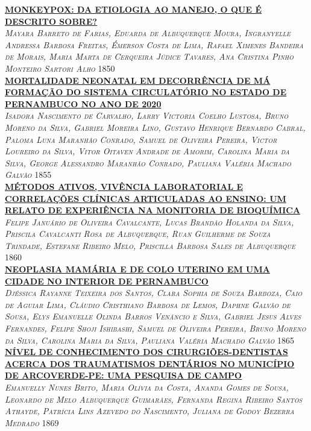 \noindent \textsc{\hyperlink{trabalhos/250264.pdf.1}{\textbf{MONKEYPOX: DA ETIOLOGIA AO MANEJO, O QUE É DESCRITO SOBRE?}}}\\ 
\noindent \textsc{\textit{Mayara Barreto de Farias, Eduarda de Albuquerque Moura, Ingranyelle Andressa Barbosa Freitas, Émerson Costa de Lima, Rafael Ximenes Bandeira de Morais, Maria Marta de Cerqueira Júdice Tavares, Ana Cristina Pinho Monteiro Sartori Alho}} \hfill 1850\\ 

\noindent \textsc{\hyperlink{trabalhos/251072.pdf.1}{\textbf{MORTALIDADE NEONATAL EM DECORRÊNCIA DE MÁ FORMAÇÃO DO SISTEMA CIRCULATÓRIO NO ESTADO DE  PERNAMBUCO NO ANO DE 2020}}}\\ 
\noindent \textsc{\textit{Isadora Nascimento de Carvalho, Larry Victoria Coelho Lustosa, Bruno Moreno da Silva, Gabriel Moreira Lino, Gustavo Henrique Bernardo Cabral, Paloma Luna Maranhão Conrado, Samuel de Oliveira Pereira, Victor Loureiro da Silva, Vitor Oitaven Andrade de Amorim, Carolina Maria da Silva, George Alessandro Maranhão Conrado, Pauliana Valéria Machado Galvão}} \hfill 1855\\ 

\noindent \textsc{\hyperlink{trabalhos/251403.pdf.1}{\textbf{MÉTODOS ATIVOS, VIVÊNCIA LABORATORIAL E CORRELAÇÕES CLÍNICAS ARTICULADAS AO ENSINO: UM RELATO DE EXPERIÊNCIA NA MONITORIA DE BIOQUÍMICA}}}\\ 
\noindent \textsc{\textit{Felipe Januário de Oliveira Cavalcante, Lucas Brandão Holanda da Silva, Priscila Cavalcanti Rosa de Albuquerque, Ruan Guilherme de Souza Trindade, Estefane Ribeiro Melo, Priscilla Barbosa Sales de Albuquerque}} \hfill 1860\\ 

\noindent \textsc{\hyperlink{trabalhos/251853.pdf.1}{\textbf{NEOPLASIA MAMÁRIA E DE COLO UTERINO EM UMA CIDADE NO INTERIOR DE PERNAMBUCO}}}\\ 
\noindent \textsc{\textit{Djéssica Rayanne Teixeira dos Santos, Clara Sophia de Souza Barboza, Caio de Aguiar Lima, Cláudio Cristhiano Barbosa de Lemos, Daphne Galvão de Sousa, Elys Emanuelle Olinda Barros Venâncio e Silva, Gabriel Jesus Alves Fernandes, Felipe Shoji Ishibashi, Samuel de Oliveira Pereira, Bruno Moreno da Silva, Carolina Maria da Silva, Pauliana Valéria Machado Galvão}} \hfill 1865\\ 

\noindent \textsc{\hyperlink{trabalhos/251711.pdf.1}{\textbf{NÍVEL DE CONHECIMENTO DOS CIRURGIÕES-DENTISTAS ACERCA DOS TRAUMATISMOS DENTÁRIOS NO MUNICÍPIO DE ARCOVERDE-PE: UMA PESQUISA DE CAMPO}}}\\ 
\noindent \textsc{\textit{Emanuelly Nunes Brito, Maria Olívia da Costa, Ananda Gomes de Sousa, Leonardo de Melo Albuquerque Guimarães, Fernanda Regina Ribeiro Santos Athayde, Patrícia Lins Azevedo do Nascimento, Juliana de Godoy Bezerra Medrado}} \hfill 1869\\ 

